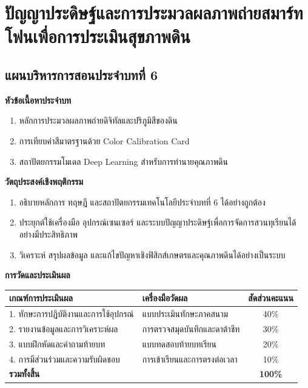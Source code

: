 \chapter{ปัญญาประดิษฐ์และการประมวลผลภาพถ่ายสมาร์ทโฟนเพื่อการประเมินสุขภาพดิน}
\label{chap:ch06}

\section*{แผนบริหารการสอนประจำบทที่ 6}

\noindent\textbf{หัวข้อเนื้อหาประจำบท}
\begin{enumerate}
    \item หลักการประมวลผลภาพถ่ายดิจิทัลและปริภูมิสีของดิน
    \item การเทียบค่าสีมาตรฐานด้วย Color Calibration Card
    \item สถาปัตยกรรมโมเดล Deep Learning สำหรับการทำนายคุณภาพดิน
\end{enumerate}

\noindent\textbf{วัตถุประสงค์เชิงพฤติกรรม}
\begin{enumerate}
    \item อธิบายหลักการ ทฤษฎี และสถาปัตยกรรมเทคโนโลยีประจำบทที่ 6 ได้อย่างถูกต้อง
    \item ประยุกต์ใช้เครื่องมือ อุปกรณ์เซนเซอร์ และระบบปัญญาประดิษฐ์เพื่อการจัดการสวนทุเรียนได้อย่างมีประสิทธิภาพ
    \item วิเคราะห์ สรุปผลข้อมูล และแก้ไขปัญหาเชิงฟิสิกส์เกษตรและคุณภาพดินได้อย่างเป็นระบบ
\end{enumerate}

\noindent\textbf{การวัดและประเมินผล}
\begin{table}[H]
\centering\small
\begin{tabularx}{\textwidth}{p{} p{} c}
\toprule
\textbf{เกณฑ์การประเมินผล} & \textbf{เครื่องมือวัดผล} & \textbf{สัดส่วนคะแนน} \\
\midrule
1. ทักษะการปฏิบัติงานและการใช้อุปกรณ์ & แบบประเมินทักษะภาคสนาม & 40\% \\
2. รายงานข้อมูลและการวิเคราะห์ผล & การตรวจสมุดบันทึกและดาต้าชีท & 30\% \\
3. แบบฝึกหัดและคำถามท้ายบท & แบบทดสอบท้ายบทเรียน & 20\% \\
4. การมีส่วนร่วมและความรับผิดชอบ & การเข้าเรียนและการตรงต่อเวลา & 10\% \\
\midrule
\textbf{รวมทั้งสิ้น} & & \textbf{100\%} \\
\bottomrule
\end{tabularx}
\end{table}
\newpage

